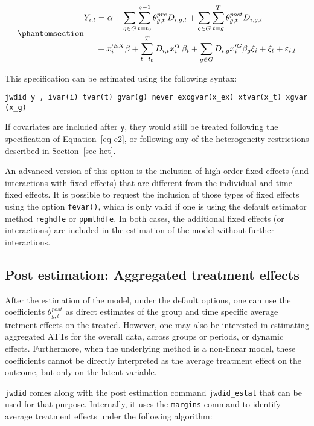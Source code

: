 \documentclass[
  letterpaper,
  DIV=11,
  numbers=noendperiod]{scrartcl}
\begin{document}
\begin{equation}\phantomsection\label{eq-op1}{\begin{aligned}
Y_{i,t} &= \alpha +  \sum_{g \in G} \sum_{t=t_0}^{g-1} \theta^{pre}_{g,t} D_{i,g,t}+
\sum_{g \in G} \sum_{t=g}^{T} \theta^{post}_{g,t} D_{i,g,t} \\
&+ x'^{EX}_{i}\beta + \sum_{t=t_0}^{T} D_{i,t} x'^{T}_{i}\beta_t + \sum_{g\in G} D_{i,g} x'^{G}_{i}\beta_g
\xi_i + \xi_t + \varepsilon_{i,t}
\end{aligned}
}\end{equation}

This specification can be estimated using the following syntax:

\texttt{jwdid\ y\ ,\ ivar(i)\ tvar(t)\ gvar(g)\ never\ exogvar(x\_ex)\ xtvar(x\_t)\ xgvar(x\_g)}

If covariates are included after \texttt{y}, they would still be treated
following the specification of Equation~\ref{eq-e2}, or following any of
the heterogeneity restrictions described in Section~\ref{sec-het}.

An advanced version of this option is the inclusion of high order fixed
effects (and interactions with fixed effects) that are different from
the individual and time fixed effects. It is possible to request the
inclusion of those types of fixed effects using the option
\texttt{fevar()}, which is only valid if one is using the default
estimator method \texttt{reghdfe} or \texttt{ppmlhdfe}. In both cases,
the additional fixed effects (or interactions) are included in the
estimation of the model without further interactions.

\subsection{Post estimation: Aggregated treatment
effects}\label{sec-agg}

After the estimation of the model, under the default options, one can
use the coefficients \(\theta^{post}_{g,t}\) as direct estimates of the
group and time specific average tretment effects on the treated.
However, one may also be interested in estimating aggregated ATTs for
the overall data, across groups or periods, or dynamic effects.
Furthermore, when the underlying method is a non-linear model, these
coefficients cannot be directly interpreted as the average treatment
effect on the outcome, but only on the latent variable.

\texttt{jwdid} comes along with the post estimation command
\texttt{jwdid\_estat} that can be used for that purpose. Internally, it
uses the \texttt{margins} command to identify average treatment effects
under the following algorithm:
\end{document}
